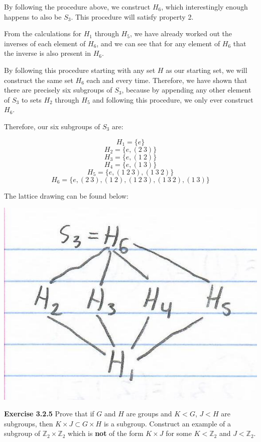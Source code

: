 \documentclass[a4paper]{article}
\begin{document}
\begin{myparindent}{0pt}
By following the procedure above, we construct $H_6$, which interestingly enough
happens to also be $S_3$. This procedure will satisfy property 2. \newline

From the calculations for $H_1$ through $H_5$, we have already worked out the
inverses of each element of $H_6$, and we can see that for any element of $H_6$
that the inverse is also present in $H_6$. \newline

By following this procedure starting with any set $H$ as our starting set, we
will construct the same set $H_6$ each and every time. Therefore, we have shown
that there are precisely six subgroups of $S_3$, because by appending any other
element of $S_3$ to sets $H_2$ through $H_5$ and following this procedure, we
only ever construct $H_6$. \newline

Therefore, our six subgroups of $S_3$ are:

\[ H_1 = \{e\} \]
\[ H_2 = \{e, (2 ~3)\} \]
\[ H_3 = \{e, (1 ~2)\} \]
\[ H_4 = \{e, (1 ~3)\} \]
\[ H_5 = \{e, (1 ~2 ~3), (1 ~3 ~2) \} \]
\[ H_6 = \{ e, (2 ~3), (1 ~2), (1 ~2 ~3), (1 ~3 ~2), (1 ~3) \} \]

The lattice drawing can be found below:

\includegraphics{lattice-S3} \newline

\textbf{Exercise 3.2.5}
Prove that if $G$ and $H$ are groups and $K < G$, $J < H$ are subgroups, then
$K \times J \subset G \times H$ is a subgroup. Construct an example of a
subgroup of $\mathbb{Z}_2 \times \mathbb{Z}_2$ which is \textbf{not} of the form
$K \times J$ for some $K < \mathbb{Z}_2$ and $J < \mathbb{Z}_2$.


\end{myparindent}
\end{document}
